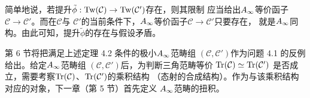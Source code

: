 简单地说，若提升$\tilde{\phi}:\operatorname{Tw}(\mathcal{C})\to\operatorname{Tw}(\mathcal{C}')$存在，则其限制
应当给出$A_{\infty}$等价函子$\mathcal{C}\to\mathcal{C}'$。而在$\mathcal{C}$与
$\mathcal{C}'$的当前条件下，$A_{\infty}$等价函子$\mathcal{C}\to\mathcal{C}'$只要存在，
就是$A_{\infty}$同构。由此可知，提升$\tilde{\phi}$的存在与假设矛盾。


第 6 节将把满足上述定理 4.2 条件的极小$A_{\infty}$范畴组
$(\mathcal{C},\mathcal{C}')$作为问题 4.1 的反例给出。给定$A_{\infty}$范畴组
$(\mathcal{C},\mathcal{C}')$后，为判断三角范畴等价
$\operatorname{Tr}(\mathcal{C})\simeq\operatorname{Tr}(\mathcal{C}')$
是否成立，需要考察$\operatorname{Tr}(\mathcal{C})$、$\operatorname{Tr}(\mathcal{C}')$的乘积结构
（态射的合成结构）。作为与该乘积结构对应的对象，下一章（第 5 节）首先定义
$A_{\infty}$范畴的扭积。

